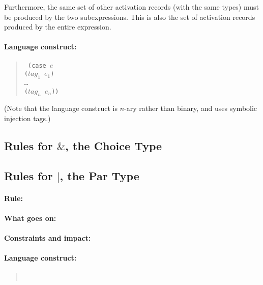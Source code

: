 \documentclass[a4paper]{article}
\begin{document}
Furthermore, the same set of other activation records (with the same
types) must be produced by the two subexpressions. This is also the
set of activation records produced by the entire expression.

\paragraph{Language construct:}
\begin{quote}\tt
  (case $e$\\
  \phantom{ }\quad ($\mathit{tag_1}$ $\mathit{e_1}$)\\
  \phantom{ }\quad \ldots\\
  \phantom{ }\quad ($\mathit{tag_n}$ $\mathit{e_n}$))
\end{quote}
(Note that the language construct is $n$-ary rather than binary, and
uses symbolic injection tags.)



\subsection{Rules for $\&$, the Choice Type}

\subsection{Rules for $|$, the Par Type}

\paragraph{Rule:}
\paragraph{What goes on:}
\paragraph{Constraints and impact:}
\paragraph{Language construct:}
\begin{quote}\tt
\end{quote}



\end{document}
